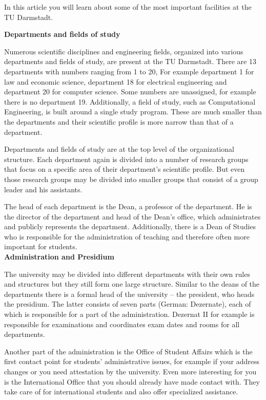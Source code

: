 {In this article you will learn about some of the most important facilities at the TU Darmstadt.
}{
    \textbf{Departments and fields of study}

    Numerous scientific disciplines and engineering fields, organized into various departments and fields of study, are present at the TU Darmstadt.
    There are 13 departments with numbers ranging from 1 to 20, For example department 1 for law and economic science, department 18 for electrical engineering and department 20 for computer science. Some numbers are unassigned, for example there is no department 19. Additionally, a field of study, such as Computational Engineering, is built around a single study program. These are much smaller than the departments and their scientific profile is more narrow than that of a department.

    Departments and fields of study are at the top level of the organizational structure. Each department again is divided into a number of research groups that focus on a specific area of their department's scientific profile. But even those research groups may be divided into smaller groups that consist of a group leader and his assistants.

    The head of each department is the Dean, a professor of the department. He is the director of the department and head of the Dean's office, which administrates and publicly represents the department.
    Additionally, there is a Dean of Studies who is responsible for the administration of teaching and therefore often more important for students.\\

    \textbf{Administration and Presidium}

    The university may be divided into different departments with their own rules and structures but they still form one large structure. Similar to the deans of the departments there is a formal head of the university -- the president, who heads the presidium. The latter consists of seven parts (German: Dezernate), each of which is responsible for a part of the administration. Dezernat II for example is responsible for examinations and coordinates exam dates and rooms for all departments.

    Another part of the administration is the Office of Student Affairs which is the first contact point for students' administrative issues, for example if your address changes or you need attestation by the university. Even more interesting for you is the International Office that you should already have made contact with. They take care of for international students and also offer specialized assistance.\\

}
